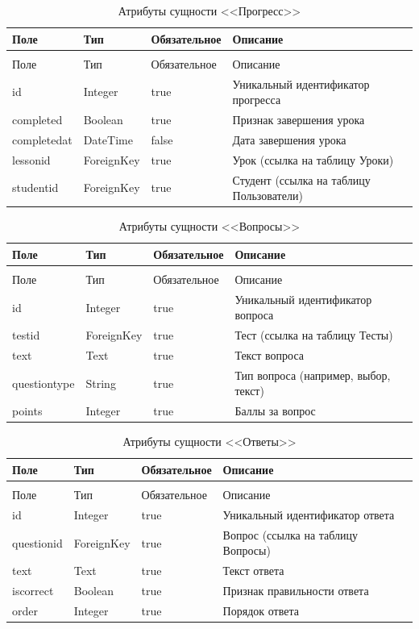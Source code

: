 \begin{xltabular}{\textwidth}{|l|l|p{3.2cm}|X|}
	\caption{Атрибуты сущности <<Прогресс>>\label{progress:table}}\\ \hline
	Поле & Тип & Обязательное & Описание \\ \hline
	\endfirsthead
	\\ \hline
	Поле & Тип & Обязательное & Описание \\ \hline
	\endhead
	id & Integer & true & Уникальный идентификатор прогресса \\ \hline
	completed & Boolean & true & Признак завершения урока \\ \hline
	completedat & DateTime & false & Дата завершения урока \\ \hline
	lessonid & ForeignKey & true & Урок (ссылка на таблицу Уроки) \\ \hline
	studentid & ForeignKey & true & Студент (ссылка на таблицу Пользователи) \\ \hline
\end{xltabular}

\begin{xltabular}{\textwidth}{|l|l|p{3.2cm}|X|}
	\caption{Атрибуты сущности <<Вопросы>>\label{questions:table}}\\ \hline
	Поле & Тип & Обязательное & Описание \\ \hline
	\endfirsthead
	\\ \hline
	Поле & Тип & Обязательное & Описание \\ \hline
	\endhead
	id & Integer & true & Уникальный идентификатор вопроса \\ \hline
	testid & ForeignKey & true & Тест (ссылка на таблицу Тесты) \\ \hline
	text & Text & true & Текст вопроса \\ \hline
	questiontype & String & true & Тип вопроса (например, выбор, текст) \\ \hline
	points & Integer & true & Баллы за вопрос \\ \hline
\end{xltabular}

\begin{xltabular}{\textwidth}{|l|l|p{3.2cm}|X|}
	\caption{Атрибуты сущности <<Ответы>>\label{answers:table}}\\ \hline
	Поле & Тип & Обязательное & Описание \\ \hline
	\endfirsthead
	\\ \hline
	Поле & Тип & Обязательное & Описание \\ \hline
	\endhead
	id & Integer & true & Уникальный идентификатор ответа \\ \hline
	questionid & ForeignKey & true & Вопрос (ссылка на таблицу Вопросы) \\ \hline
	text & Text & true & Текст ответа \\ \hline
	iscorrect & Boolean & true & Признак правильности ответа \\ \hline
	order & Integer & true & Порядок ответа \\ \hline
\end{xltabular}

